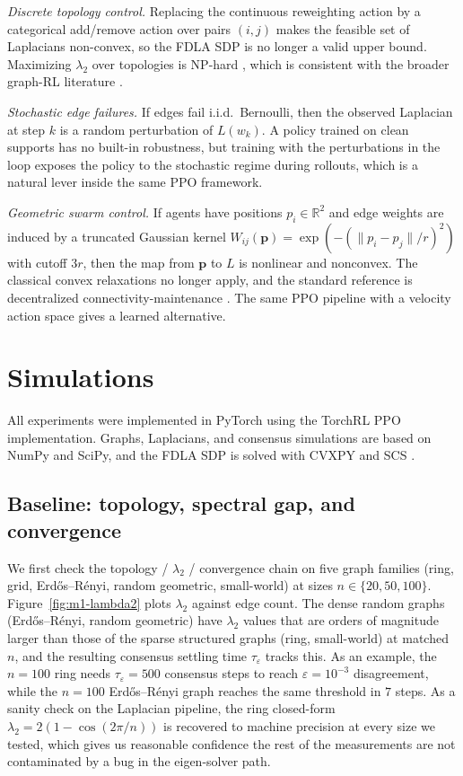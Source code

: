 \documentclass[letterpaper, 11 pt, journal, twoside]{IEEEtran}
\newcommand{\R}{\mathbb{R}}
\begin{document}
\emph{Discrete topology control.} Replacing the continuous
reweighting action by a categorical add/remove action over pairs
$(i,j)$ makes the feasible set of Laplacians non-convex, so the
FDLA SDP is no longer a valid upper bound. Maximizing $\lambda_2$
over topologies is NP-hard \cite{Mosk2006}, which is consistent with
the broader graph-RL literature
\cite{Darvariu2024,Darvariu2021,Dai2017}.

\emph{Stochastic edge failures.} If edges fail i.i.d.\ Bernoulli,
then the observed Laplacian at step $k$ is a random perturbation of
$L(w_k)$. A policy trained on clean supports has no built-in
robustness, but training with the perturbations in the loop exposes
the policy to the stochastic regime during rollouts, which is a
natural lever inside the same PPO framework.

\emph{Geometric swarm control.} If agents have positions
$p_i \in \R^2$ and edge weights are induced by a truncated Gaussian
kernel $W_{ij}(\mathbf{p}) = \exp(-(\|p_i-p_j\|/r)^2)$ with cutoff
$3r$, then the map from $\mathbf{p}$ to $L$ is nonlinear and
nonconvex. The classical convex relaxations no longer apply, and
the standard reference is decentralized connectivity-maintenance
\cite{SabattiniEtAl2013,YangFreeman2010,KimMesbahi2006}. The same
PPO pipeline with a velocity action space gives a learned
alternative.

\section{Simulations}
\label{sec:sim}

All experiments were implemented in PyTorch using the TorchRL PPO
implementation. Graphs, Laplacians, and consensus simulations are
based on NumPy and SciPy, and the FDLA SDP is solved with CVXPY and
SCS \cite{BoydVandenberghe2004}.

\subsection{Baseline: topology, spectral gap, and convergence}
\label{sec:sim-m1}
We first check the topology / $\lambda_2$ / convergence chain on
five graph families (ring, grid, Erd\H{o}s--R\'enyi, random
geometric, small-world) at sizes $n \in \{20, 50, 100\}$.
Figure~\ref{fig:m1-lambda2} plots $\lambda_2$ against edge count.
The dense random graphs (Erd\H{o}s--R\'enyi, random geometric) have
$\lambda_2$ values that are orders of magnitude larger than those of
the sparse structured graphs (ring, small-world) at matched $n$, and
the resulting consensus settling time $\tau_\varepsilon$ tracks
this. As an example, the $n = 100$ ring needs
$\tau_\varepsilon = 500$ consensus steps to reach $\varepsilon =
10^{-3}$ disagreement, while the $n = 100$ Erd\H{o}s--R\'enyi graph
reaches the same threshold in $7$ steps. As a sanity check on the
Laplacian pipeline, the ring closed-form $\lambda_2 = 2(1 -
\cos(2\pi/n))$ is recovered to machine precision at every size we
tested, which gives us reasonable confidence the rest of the
measurements are not contaminated by a bug in the eigen-solver path.
\end{document}
